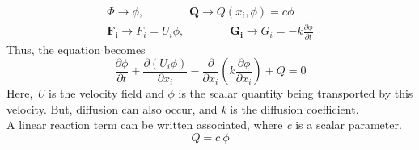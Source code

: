 \documentclass[12pt, oneside]{article}
\begin{document}
	\begin{equation}
	   \begin{aligned}
		\Phi \rightarrow \phi, \quad \quad \quad \quad \boldsymbol{Q} \rightarrow Q(x_i, \phi) = c \phi\\
		\boldsymbol{F_i} \rightarrow F_i = U_i\phi, \quad \quad \quad \quad \boldsymbol{G_i} \rightarrow G_i = -k \frac{\partial\phi}{\partial t}
	    \end{aligned}
	\end{equation}
Thus, the equation becomes
   \begin{equation}
\frac{\partial\phi}{\partial t} + \frac{\partial{(U_i\phi)}}{\partial{x_i}} - \frac{\partial}{\partial{x_i}}(k \frac{\partial\phi}{\partial{x_i}}) + Q = 0
   \end{equation}
Here, \textit{U} is the velocity field and $\phi$ is the scalar quantity being transported by this velocity. But, diffusion can also occur, and \textit{k} is the diffusion coefficient.\\
A linear reaction term can be written associated, where \textit{c} is a scalar parameter.
\[
    Q = c\ \phi
\]
\end{document}
